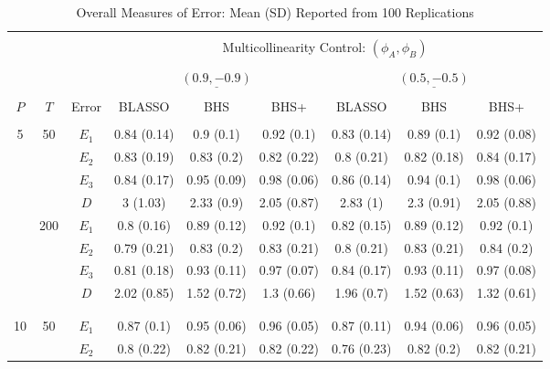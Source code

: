 \begin{table}[H]
\scriptsize
\centering
\caption{Overall Measures of Error: Mean (SD) Reported from 100 Replications}
\begin{tabular}{ccc|ccc|ccc}
  \hline
  \multicolumn{3}{c|}{} & \multicolumn{6}{c}{} \\ 
  & & & & \multicolumn{4}{c}{Multicollinearity Control: $(\phi_A,\phi_B)$} &  \\
  \multicolumn{3}{c|}{} & \multicolumn{6}{c}{} \\ 
   &  & & \multicolumn{3}{c}{$\underline{(0.9 ,-0.9)} $} & \multicolumn{3}{c}{$\underline{(0.5 ,-0.5)} $}   \\
 \multicolumn{3}{c|}{} & \multicolumn{6}{c}{} \\ 
 $P$ & $T$ & Error & BLASSO & BHS & BHS+ & BLASSO & BHS & BHS+ \\ 
  \hline
  \multicolumn{3}{c|}{} & \multicolumn{6}{c}{} \\ 
  \multirow{8}{*}{5} & \multirow{4}{*}{50} & $E_1$ & 0.84 (0.14) & 0.9 (0.1) & 0.92 (0.1) & 0.83 (0.14) & 0.89 (0.1) & 0.92 (0.08) \\ 
  & & $E_2$ & 0.83 (0.19) & 0.83 (0.2) & 0.82 (0.22) & 0.8 (0.21) & 0.82 (0.18) & 0.84 (0.17) \\ 
  & & $E_3$ & 0.84 (0.17) & 0.95 (0.09) & 0.98 (0.06) & 0.86 (0.14) & 0.94 (0.1) & 0.98 (0.06) \\ 
  & & $D$ & 3 (1.03) & 2.33 (0.9) & 2.05 (0.87) & 2.83 (1) & 2.3 (0.91) & 2.05 (0.88) \\ 
  & \multirow{4}{*}{200} & $E_1$ & 0.8 (0.16) & 0.89 (0.12) & 0.92 (0.1) & 0.82 (0.15) & 0.89 (0.12) & 0.92 (0.1) \\ 
  & & $E_2$ & 0.79 (0.21) & 0.83 (0.2) & 0.83 (0.21) & 0.8 (0.21) & 0.83 (0.21) & 0.84 (0.2) \\ 
  & & $E_3$ & 0.81 (0.18) & 0.93 (0.11) & 0.97 (0.07) & 0.84 (0.17) & 0.93 (0.11) & 0.97 (0.08) \\ 
  & & $D$ & 2.02 (0.85) & 1.52 (0.72) & 1.3 (0.66) & 1.96 (0.7) & 1.52 (0.63) & 1.32 (0.61) \\ 
  \multicolumn{3}{c|}{} & \multicolumn{6}{c}{} \\ 
  \hline
  \multicolumn{3}{c|}{} & \multicolumn{6}{c}{} \\ 
  \multirow{8}{*}{10} & \multirow{4}{*}{50} & $E_1$ & 0.87 (0.1) & 0.95 (0.06) & 0.96 (0.05) & 0.87 (0.11) & 0.94 (0.06) & 0.96 (0.05) \\ 
  & & $E_2$ & 0.8 (0.22) & 0.82 (0.21) & 0.82 (0.22) & 0.76 (0.23) & 0.82 (0.2) & 0.82 (0.21) \\ 

\end{tabular}
\end{table}
